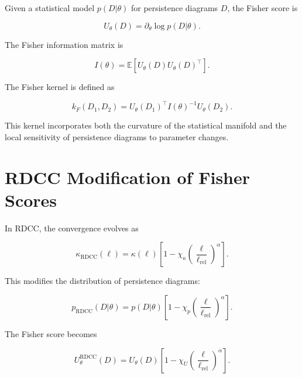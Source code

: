 \documentclass[11pt,a4paper]{article}
\begin{document}
Given a statistical model $p(D|\theta)$ for persistence diagrams $D$, the Fisher 
score is

\begin{equation}
    U_{\theta}(D)
    = \partial_{\theta} \log p(D|\theta).
\end{equation}

The Fisher information matrix is

\begin{equation}
    I(\theta)
    = \mathbb{E}
      \left[
        U_{\theta}(D) U_{\theta}(D)^{\top}
      \right].
\end{equation}

The Fisher kernel is defined as

\begin{equation}
    k_{F}(D_{1}, D_{2})
    = U_{\theta}(D_{1})^{\top}
      I(\theta)^{-1}
      U_{\theta}(D_{2}).
\end{equation}

This kernel incorporates both the curvature of the statistical manifold and the 
local sensitivity of persistence diagrams to parameter changes.
\section{RDCC Modification of Fisher Scores}

In RDCC, the convergence evolves as

\begin{equation}
    \kappa_{\mathrm{RDCC}}(\ell)
    = \kappa(\ell)
      \left[
        1 - \chi_{\kappa}
        \left(\frac{\ell}{\ell_{\mathrm{rel}}}\right)^{\alpha}
      \right].
\end{equation}

This modifies the distribution of persistence diagrams:



\[
    p_{\mathrm{RDCC}}(D|\theta)
    = p(D|\theta)
      \left[
        1 - \chi_{p}
        \left(\frac{\ell}{\ell_{\mathrm{rel}}}\right)^{\alpha}
      \right].
\]



The Fisher score becomes

\begin{equation}
    U^{\mathrm{RDCC}}_{\theta}(D)
    = U_{\theta}(D)
      \left[
        1 - \chi_{U}
        \left(\frac{\ell}{\ell_{\mathrm{rel}}}\right)^{\alpha}
      \right].
\end{equation}
\end{document}
